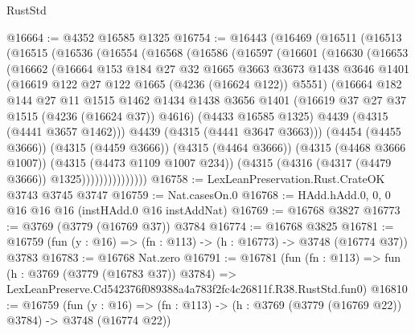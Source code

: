 \begin{lexlean}{RustStd}
\begin{coremodule}
@16664 := @4352 @16585 @1325
@16754 := @16443
    (@16469
      (@16511
        (@16513
          (@16515
            (@16536
              (@16554
                (@16568
                  (@16586
                    (@16597
                      (@16601
                        (@16630
                          (@16653
                            (@16662
                              (@16664
                                @153
                                @184
                                @27
                                @32
                                @1665
                                @3663
                                @3673
                                @1438
                                @3646
                                @1401
                                (@16619 @122 @27 @122 @1665 (@4236 (@16624 @122)) @5551)
                                (@16664
                                  @182
                                  @144
                                  @27
                                  @11
                                  @1515
                                  @1462
                                  @1434
                                  @1438
                                  @3656
                                  @1401
                                  (@16619 @37 @27 @37 @1515 (@4236 (@16624 @37)) @4616)
                                  (@4433 @16585 @1325)
                                  @4439
                                  (@4315 (@4441 @3657 @1462)))
                                @4439
                                (@4315 (@4441 @3647 @3663)))
                              (@4454 (@4455 @3666))
                              (@4315 (@4459 @3666))
                              (@4315 (@4464 @3666))
                              (@4315 (@4468 @3666 @1007))
                              (@4315 (@4473 @1109 @1007 @234))
                              (@4315 (@4316 (@4317 (@4479 @3666)) @1325)))))))))))))))
@16758 := LexLeanPreservation.Rust.CrateOK @3743 @3745 @3747
@16759 := Nat.casesOn.{0}
@16768 := HAdd.hAdd.{0, 0, 0} @16 @16 @16 (instHAdd.{0} @16 instAddNat)
@16769 := @16768 @3827
@16773 := @3769 (@3779 (@16769 @37)) @3784
@16774 := @16768 @3825
@16781 := @16759 (fun (y : @16) => (fn : @113) -> (h : @16773) -> @3748 (@16774 @37)) @3783
@16783 := @16768 Nat.zero
@16791 := @16781
    (fun (fn : @113) =>
    fun (h : @3769 (@3779 (@16783 @37)) @3784) =>
    LexLeanPreserve.Cd542376f089388a4a783f2fc4c26811f.R38.RustStd.fun0)
@16810 := @16759
    (fun (y : @16) => (fn : @113) -> (h : @3769 (@3779 (@16769 @22)) @3784) -> @3748 (@16774 @22))

\end{coremodule}
\end{lexlean}
